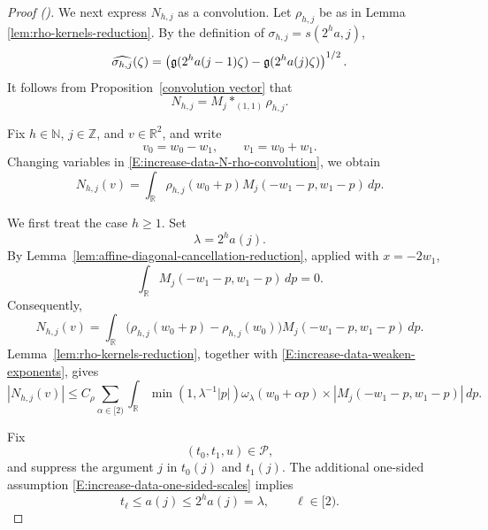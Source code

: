 \documentclass[12pt,reqno]{amsart}
\newcommand{\auto}{{({\tiny\faCar})}}
\theoremstyle{plain}
\numberwithin{equation}{section}
\theoremstyle{remark}
\begin{document}
\begin{proof}[Proof \auto]
We next express \(N_{h,j}\) as a convolution. Let
\(\rho_{h,j}\) be as in Lemma~
\ref{lem:rho-kernels-reduction}. By the definition of
\(\sigma_{h,j}=s(2^ha,j)\),
\[
\widehat{\sigma_{h,j}}(\zeta)
=
\left(
\mathfrak{g}(2^ha(j-1)\zeta)
-
\mathfrak{g}(2^ha(j)\zeta)
\right)^{1/2}.
\]
It follows from Proposition~\ref{convolution vector} that
\begin{equation}
    \label{E:increase-data-N-rho-convolution}
    N_{h,j}
    =
    M_j\ast_{(1,1)}\rho_{h,j}.
\end{equation}

Fix \(h\in\mathbb N\), \(j\in\mathbb Z\), and \(v\in\mathbb R^2\),
and write
\[
v_0=w_0-w_1,
\qquad
v_1=w_0+w_1.
\]
Changing variables in
\eqref{E:increase-data-N-rho-convolution}, we obtain
\begin{equation}
    \label{E:increase-data-convolution-coordinates}
    N_{h,j}(v)
    =
    \int_{\mathbb R}
    \rho_{h,j}(w_0+p)
    M_j(-w_1-p,w_1-p)\,dp.
\end{equation}

We first treat the case \(h\geq1\). Set
\[
\lambda=2^ha(j).
\]
By Lemma~\ref{lem:affine-diagonal-cancellation-reduction},
applied with \(x=-2w_1\),
\[
\int_{\mathbb R}
M_j(-w_1-p,w_1-p)\,dp=0.
\]
Consequently,
\begin{equation}
    \label{E:increase-data-cancelled-convolution}
    N_{h,j}(v) = \int_{\mathbb R} \bigl( \rho_{h,j}(w_0+p)-\rho_{h,j}(w_0) \bigr) M_j(-w_1-p,w_1-p)\,dp.
\end{equation}
Lemma~\ref{lem:rho-kernels-reduction}, together with
\eqref{E:increase-data-weaken-exponents}, gives
\begin{equation}
    \label{E:increase-data-cancelled-majorant}
    |N_{h,j}(v)| \leq C_\rho \sum_{\alpha\in[2)} \int_{\mathbb R} \min(1,\lambda^{-1}|p|) \omega_\lambda(w_0+\alpha p) \times |M_j(-w_1-p,w_1-p)|\,dp.
\end{equation}

Fix
\[
(t_0,t_1,u)\in\mathcal P,
\]
and suppress the argument \(j\) in \(t_0(j)\) and \(t_1(j)\).
The additional one-sided assumption \eqref{E:increase-data-one-sided-scales} implies
\begin{equation}
    \label{E:increase-data-scale-comparison}
    t_\ell
    \leq
    a(j)
    \leq
    2^ha(j)
    =
    \lambda,
    \qquad
    \ell\in[2).
\end{equation}


\end{proof}
\end{document}
